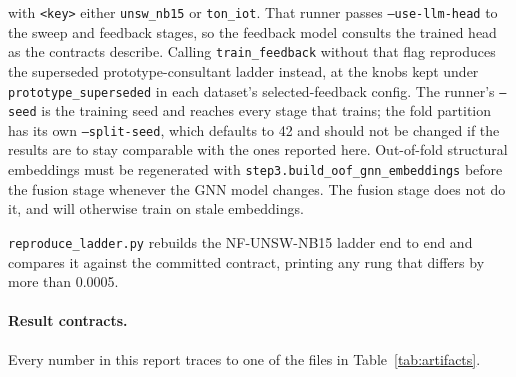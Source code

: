 \begin{sloppypar}
with \texttt{<key>} either \texttt{unsw\_nb15} or \texttt{ton\_iot}. That runner passes
\texttt{--use-llm-head} to the sweep and feedback stages, so the feedback model consults the
trained head as the contracts describe. Calling \texttt{train\_feedback} without that flag
reproduces the superseded prototype-consultant ladder instead, at the knobs kept under
\texttt{prototype\_superseded} in each dataset's selected-feedback config. The runner's
\texttt{--seed} is the training seed and reaches every stage that trains; the fold partition
has its own \texttt{--split-seed}, which defaults to 42 and should not be changed if the
results are to stay comparable with the ones reported here. Out-of-fold structural embeddings
must be regenerated with \texttt{step3.build\_oof\_gnn\_embeddings} before the fusion stage
whenever the GNN model changes. The fusion stage does not do it, and will otherwise train on
stale embeddings.

\texttt{reproduce\_ladder.py} rebuilds the NF-UNSW-NB15 ladder end to end and compares it
against the committed contract, printing any rung that differs by more than 0.0005.
\end{sloppypar}

\paragraph{Result contracts.} Every number in this report traces to one of the files in
Table~\ref{tab:artifacts}.

